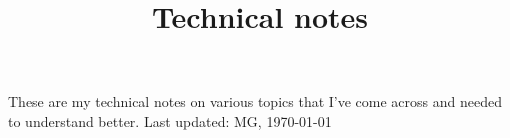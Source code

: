 \documentclass[a4paper]{article}
\theoremstyle{noparens}
\theoremstyle{noparensdef}
\theoremstyle{note}
\numberwithin{equation}{section}
\begin{document}
\setlength{\parindent}{0pt}
\setlength{\parskip}{1ex plus 0.5ex minus 0.2ex}

\title{Technical notes}

These are my technical notes on various topics that I've come across and needed to understand better. Last updated: MG, \today

\tableofcontents





















%











\cleardoublepage
{}
\printindex
\end{document}
